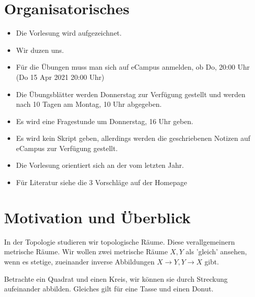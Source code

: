 
\section*{Organisatorisches}
\begin{itemize}
\item    Die Vorlesung wird aufgezeichnet.
\item Wir duzen uns.
\item Für die Übungen muss man sich auf eCampus anmelden, ob Do, 20:00 Uhr (Do 15 Apr 2021 20:00 Uhr)
\item Die Übungsblätter werden Donnerstag zur Verfügung gestellt und werden nach 10 Tagen am Montag, 10 Uhr abgegeben.
\item Es wird eine Fragestunde um Donnerstag, 16 Uhr geben.
\item Es wird kein Skript geben, allerdings werden die geschriebenen Notizen auf eCampus zur Verfügung gestellt.
\item Die Vorlesung orientiert sich an der vom letzten Jahr.
\item Für Literatur siehe die 3 Vorschläge auf der Homepage
\end{itemize}

\setcounter{section}{-1}

\section{Motivation und Überblick}
In der Topologie studieren wir topologische Räume. Diese verallgemeinern metrische Räume. Wir wollen zwei metrische Räume $X,Y$ als 'gleich' ansehen, wenn es stetige, zueinander inverse Abbildungen  $X \to  Y, Y\to X$ gibt.
\begin{example}
    Betrachte ein Quadrat und einen Kreis, wir können sie durch Streckung aufeinander abbilden. Gleiches gilt für eine Tasse und einen Donut. \\
    \begin{minipage}{\textwidth}
    \centering
    \begin{minipage}{0.45\textwidth}
    \end{minipage}
    \begin{minipage}{0.45\textwidth}
    \end{minipage}
\end{minipage}
\end{example}




